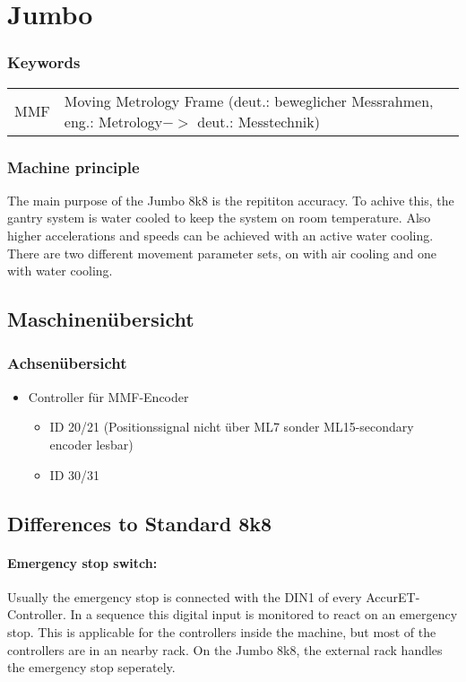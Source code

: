 \section{Jumbo}
\subsubsection{Keywords}
\begin{tabular}{lp{15cm}}
	MMF & Moving Metrology Frame (deut.: beweglicher Messrahmen, eng.: Metrology$ -> $ deut.: Messtechnik)
\end{tabular}
\subsubsection{Machine principle}
The main purpose of the Jumbo 8k8 is the repititon accuracy. To achive this, the gantry system is water cooled to keep the system on room temperature. Also higher accelerations and speeds can be achieved with an active water cooling. There are two different movement parameter sets, on with air cooling and one with water cooling.
\subsection{Maschinenübersicht}
\subsubsection{Achsenübersicht}
\begin{itemize}
	\item Controller für MMF-Encoder
	\begin{itemize}
		\item ID 20/21 (Positionssignal nicht über ML7 sonder ML15-secondary encoder lesbar)
		\item ID 30/31
	\end{itemize}
\end{itemize}

\subsection{Differences to Standard 8k8}
\paragraph{Emergency stop switch:} Usually the emergency stop is connected with the DIN1 of every AccurET-Controller. In a sequence this digital input is monitored to react on an emergency stop. This is applicable for the controllers inside the machine, but most of the controllers are in an nearby rack. On the Jumbo 8k8, the external rack handles the emergency stop seperately. 

